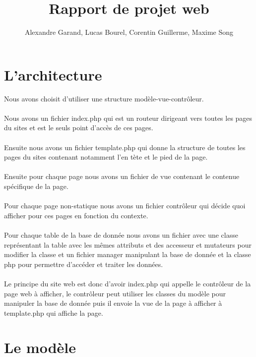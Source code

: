 \documentclass{article}
\title{Rapport de projet web}
\author{Alexandre Garand, Lucas Bourel, Corentin Guillerme, Maxime Song}
\begin{document}
\maketitle
\newpage

\section{L'architecture}
	Nous avons choisit d'utiliser une structure modèle-vue-contrôleur.\\ \\
	Nous avons un fichier index.php qui est un routeur dirigeant vers toutes les pages du sites et est le seuls point d’accès de ces pages.\\ \\
	Ensuite nous avons un fichier template.php qui donne la structure de toutes les pages du sites contenant notamment l'en tète et le pied de la page.\\ \\
	Ensuite pour chaque page nous avons un fichier de vue contenant le contenue spécifique de la page.\\ \\
	Pour chaque page non-statique nous avons un fichier contrôleur qui décide quoi afficher pour ces pages en fonction du contexte.\\ \\
	Pour chaque table de la base de donnée nous avons un fichier avec une classe représentant la table avec les mêmes attributs et des accesseur et mutateurs pour modifier la classe et un fichier manager manipulant la base de donnée et la classe php pour permettre d'accéder et traiter les données.\\ \\
	Le principe du site web est donc d'avoir index.php qui appelle le contrôleur de la page web à afficher, le contrôleur peut utiliser les classes du modèle pour manipuler la base de donnée puis il envoie la vue de la page à afficher à template.php qui affiche la page.
\section{Le modèle}
\end{document}
